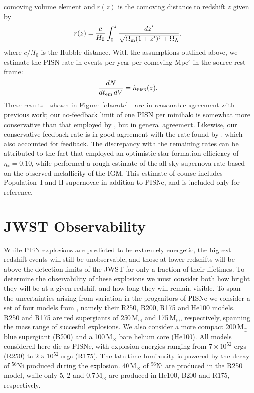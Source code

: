 \documentclass{thesis}
\newcommand{\msun}{\ensuremath{\,\mathrm{M}_{\odot}}\xspace}
\newcommand{\RefFig}[1]{\mbox{Figure~\ref{#1}}}
\begin{document}
comoving volume element and $r(z)$ is the comoving distance to
redshift $z$ given by
\begin{equation}
r(z) = \frac{c}{H_0}\int_0^z \frac{dz'}{\sqrt{\Omega_{\rm m} (1+z')^3 +
    \Omega_{\Lambda}}},
\end{equation}
where $c/H_0$ is the Hubble distance.  With the assumptions outlined
above, we estimate the PISN rate in events per year per comoving
Mpc$^3$ in the source rest frame:
\begin{equation}
\frac{dN}{dt_{\rm em}\,dV} = \dot{n}_{\textsc{pisn}}(z).
\end{equation}
These results---shown in \RefFig{obsrate}---are in reasonable
agreement with previous work; our no-feedback limit of one PISN per
minihalo is somewhat more conservative than that employed by
\citet{WeinmannLilly2005}, but in general agreement.  Likewise, our
conservative feedback rate is in good agreement with the rate found by
\citet{WiseAbel2005}, which also accounted for feedback.  The
discrepancy with the remaining rates can be attributed to the fact
that \citet{MackeyBrommHernquist2003} employed an optimistic star
formation efficiency of $\eta_*=0.10$, while
\citet{Miralda-EscudeRees1997} performed a rough estimate of the
all-sky supernova rate based on the observed metallicity of the
IGM. This estimate of course includes Population~I and II supernovae in
addition to PISNe, and is included only for reference.


\section{JWST Observability}
\label{JWSTobs}
While PISN explosions are predicted to be extremely energetic, the
highest redshift events will still be unobservable, and those at lower
redshifts will be above the detection limits of the JWST for only a
fraction of their lifetimes. To determine the observability of these
explosions we must consider both how bright they will be at a given
redshift and how long they will remain visible.  To span the
uncertainties arising from variation in the progenitors of PISNe we
consider a set of four models from \citet{KasenWoosleyHeger2011},
namely their R250, B200, R175 and He100 models.  R250 and R175 are red
supergiants of 250\msun and 175\msun, respectively, spanning the mass
range of succesful explosions.  We also consider a more compact
200\msun blue supergiant (B200) and a 100\msun bare helium core
(He100).  All models considered here die as PISNe, with explosion
energies ranging from $7\times10^{52}$ ergs (R250) to $2\times10^{52}$
ergs (R175).  The late-time luminosity is powered by the decay of
$^{56}$Ni produced during the explosion.  40\msun of $^{56}$Ni are
produced in the R250 model, while only 5, 2 and 0.7\msun are produced
in He100, B200 and R175, respectively.
\end{document}
